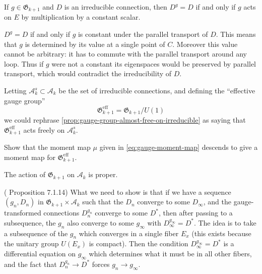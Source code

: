 \documentclass[12pt,letterpaper,reqno]{article}
\numberwithin{equation}{section}
\newcommand{\fG}{{\mathfrak G}}
\newcommand{\cA}{\ensuremath{\mathcal A}}
\newcommand{\eff}{\mathrm{eff}}
\begin{document}
\begin{prop} \label{prop:gauge-group-almost-free-on-irreducible}
If $g \in \fG_{k+1}$ and $D$ is an irreducible connection, then $D^g = D$
if and only if $g$ acts on $E$ by multiplication by a constant scalar.
\end{prop}
\begin{pf} $D^g = D$ if and only if $g$ is constant under the parallel 
transport of $D$. This means that $g$ is determined by
its value at a single point of $C$. Moreover this value cannot be arbitrary:
it has to commute with the parallel transport around any loop.
Thus if $g$ were not a constant its eigenspaces would be preserved by parallel 
transport, which would contradict the irreducibility of $D$.
\end{pf}

Letting $\cA^s_{k} \subset \cA_k$ be the set of irreducible connections,
and defining the ``effective gauge group''
\begin{equation}
 \fG^\eff_{k+1} = \fG_{k+1} / U(1)
\end{equation}
we could rephrase \autoref{prop:gauge-group-almost-free-on-irreducible}
as saying that $\fG^\eff_{k+1}$ acts freely on $\cA^s_k$.

\begin{exercise} Show that the moment map $\mu$ given in 
\eqref{eq:gauge-moment-map} descends to give a 
moment map for $\fG^\eff_{k+1}$.
\end{exercise}

\begin{prop} \label{prop:gauge-group-proper}
The action of $\fG_{k+1}$ on $\cA_k$ is proper.
\end{prop}
\begin{pf} (\cite{MR909698} Proposition 7.1.14) What we need to show is that
if we have a sequence $(g_n, D_n)$ in $\fG_{k+1} \times \cA_k$ such that the
$D_n$ converge to some $D_\infty$, and the 
gauge-transformed connections $D_n^{g_n}$ converge to some $D^*$, 
then after passing to a subsequence, 
the $g_n$ also converge to some $g_\infty$ with $D_\infty^{g_\infty} = D^*$.
The idea is to take a subsequence
of the $g_n$ which converges in a single fiber $E_x$ (this exists
because the unitary group $U(E_x)$ is compact). Then the condition 
$D_\infty^{g_\infty} = D^*$ is a differential equation on $g_\infty$
which determines what it must be in all other fibers, and the fact
that $D_n^{g_n} \to D^*$ forces $g_n \to g_\infty$.
\end{pf}
\end{document}

